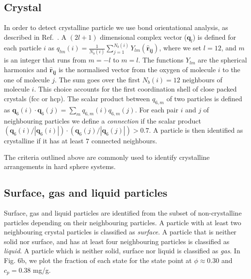 \subsection*{Crystal}
In order to detect crystalline particle we use bond orientational analysis,
as described in Ref.~\cite{russo2013interplay}.
A $(2l+1)$ dimensional complex vector ($\mathbf{q}_l$) is defined for each
particle $i$ as $q_{lm}(i)=\frac{1}{N_b(i)}\sum_{j=1}^{N_b(i)}
Y_{lm}(\mathbf{\hat{r}_{ij}})$, where we set $l=12$, and $m$ is an integer that
runs from $m=-l$ to $m=l$. The functions $Y_{lm}$ are the spherical harmonics
and $\mathbf{\hat{r}_{ij}}$ is the normalised vector from the oxygen of
molecule $i$ to the one of molecule $j$.  The sum goes over the first
$N_b(i)=12$ neighbours of molecule $i$. This choice accounts for
the first coordination shell of close packed crystals (fcc or hcp).
The scalar product between $q_{6,m}$ of two particles
is defined as $\mathbf{q}_{6}(i)\cdot\mathbf{q}_{6}(j)=\sum_m q_{6,m}(i)q_{6,m}(j)$.
For each pair $i$ and $j$ of neighbouring particles we define a \emph{connection}
if the scalar product $(\mathbf{q}_{6}(i)/|\mathbf{q}_{6}(i)|)\cdot(\mathbf{q}_{6}(j)/|\mathbf{q}_{6}(j)|)>0.7$.
A particle is then identified as crystalline if it has at least $7$ connected neighbours.

The criteria outlined above are commonly used to identify crystalline arrangements in hard sphere systems.

\subsection*{Surface, gas and liquid particles}


Surface, gas and liquid particles are identified from the subset of non-crystalline particles depending
on their neighbouring particles. A particle with at least two neighbouring crystal particles is classified as
\emph{surface}. A particle that is neither solid nor surface, and has at least four neighbouring particles
is classified as \emph{liquid}. A particle which is neither solid, surface nor liquid is classified as \emph{gas}. 
In Fig. 6b, we plot the fraction of each state for the state point at $\phi\approx 0.30$ and $c_p=0.38$ mg/g. 


